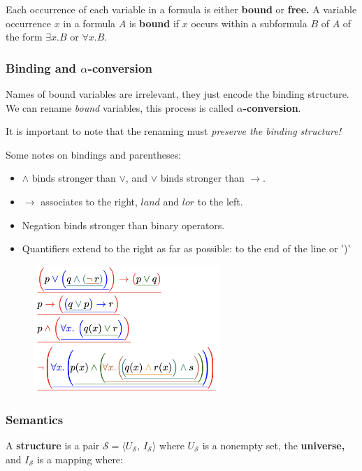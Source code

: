 \documentclass[a4paper]{extarticle}
\begin{document}
Each occurrence of each variable in a formula is either \textbf{bound} or \textbf{free.} A variable occurrence \(x\) in a formula \(A\) is \textbf{bound} if \(x\) occurs within a subformula \(B\) of \(A\) of the form \(\exists x.B\) or \(\forall x.B\).

\subsubsection{Binding and \(\alpha\)-conversion}

Names of bound variables are irrelevant, they just encode the binding structure. We can rename \textit{bound} variables, this process is called \textbf{\(\alpha\)-conversion}.

It is important to note that the renaming must \textit{preserve the binding structure!}

Some notes on bindings and parentheses:

\begin{itemize}
    \item \(\land\) binds stronger than \(\lor\), and \(\lor\) binds stronger than \(\to\).
    \item \(\to\) associates to the right, \(land\) and \(lor\) to the left.
    \item Negation binds stronger than binary operators.
    \item Quantifiers extend to the right as far as possible: to the end of the line or ')'
\end{itemize}

\begin{figure}[H]
    \includegraphics[width=7cm]{../images/FMFP_Fig2-1}
    \centering
\end{figure}

\subsubsection{Semantics}

A \textbf{structure} is a pair \(\mathcal{S} = \langle U_{\mathcal{S}}, \, I_{\mathcal{S}} \rangle\) where \(U_{\mathcal{S}}\) is a nonempty set, the \textbf{universe,} and \(I_{\mathcal{S}}\) is a mapping where:
\end{document}
